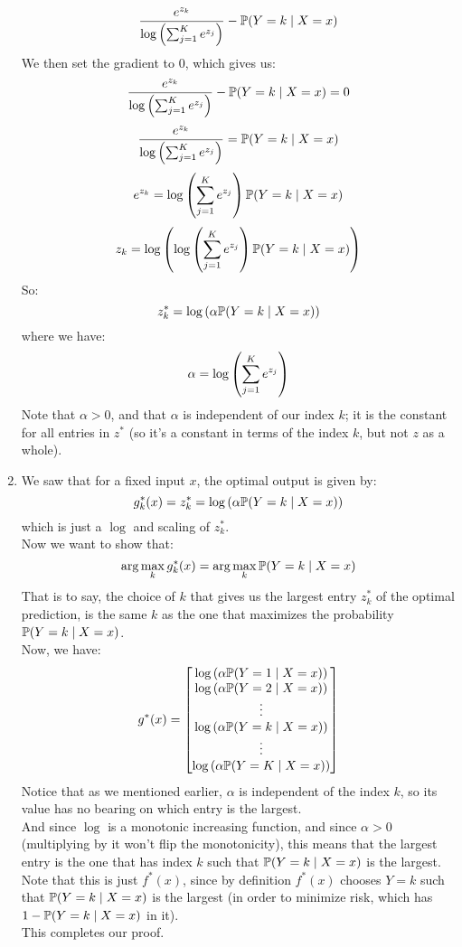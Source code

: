 \documentclass[12pt]{article}
\begin{document}
\begin{enumerate}[label=\alph*)]
    \[ \dfrac{e^{z_k}}
    {\log\left( \sum_{j=1}^K e^{z_j} \right)}
    - \mathbb{P}(Y = k \mid X = x) \]
    We then set the gradient to $0$,
    which gives us:
    \[ \dfrac{e^{z_k}}
    {\log\left( \sum_{j=1}^K e^{z_j} \right)}
    - \mathbb{P}(Y = k \mid X = x) = 0 \]
    \[ \dfrac{e^{z_k}}
    {\log\left( \sum_{j=1}^K e^{z_j} \right)}
    = \mathbb{P}(Y = k \mid X = x) \]
    \[ e^{z_k}
    = \log\left( \sum_{j=1}^K e^{z_j} \right)
    \mathbb{P}(Y = k \mid X = x) \]
    \[ z_k
    = \log\left( \log\left( \sum_{j=1}^K e^{z_j} \right)
    \mathbb{P}(Y = k \mid X = x) \right) \]
    So:
    \[ z^*_k = \log\left( 
    \alpha \mathbb{P}(Y = k \mid X = x) \right) \]
    where we have:
    \[ \alpha = \log\left( \sum_{j=1}^K e^{z_j} \right) \]
    Note that $\alpha > 0$,
    and that $\alpha$ is independent
    of our index $k$;
    it is the constant for all entries
    in $z^*$
    (so it's a constant in terms of the index $k$,
    but not $z$ as a whole). \\
    \item 
    We saw that for a fixed input $x$,
    the optimal output is given by:
    \[ g^*_k(x) = z^*_k = \log\left( 
    \alpha \mathbb{P}(Y = k \mid X = x) \right) \]
    which is just a $\log$
    and scaling of $z^*_k$. \\
    Now we want to show that:
    \[ \arg \max_k g^*_k(x)
    =  \arg \max_k \mathbb{P}(Y = k \mid X = x) \]
    That is to say,
    the choice of $k$
    that gives us the largest
    entry $z^*_k$ of the optimal prediction,
    is the same $k$ as the one that
    maximizes the probability
    $\mathbb{P}(Y = k \mid X = x)$. \\
    Now, we have:
    \[ g^*(x)
    = \begin{bmatrix}
        \log\left( \alpha
        \mathbb{P}(Y = 1 \mid X = x) \right) \\
        \log\left( \alpha
        \mathbb{P}(Y = 2 \mid X = x) \right) \\ 
        \vdots \\
        \log\left( \alpha
        \mathbb{P}(Y = k \mid X = x) \right) \\ 
        \vdots \\
        \log\left( \alpha
        \mathbb{P}(Y = K \mid X = x) \right) \\ 
    \end{bmatrix} \]
    Notice that as we mentioned earlier,
    $\alpha$ is independent of the index $k$,
    so its value has no bearing on
    which entry is the largest. \\
    And since $\log$ is a monotonic
    increasing function,
    and since $\alpha > 0$
    (multiplying by it won't 
    flip the monotonicity),
    this means that the largest entry
    is the one that has index $k$ such that
    $\mathbb{P}(Y = k \mid X = x)$
    is the largest. \\
    Note that this is just $f^*(x)$,
    since by definition $f^*(x)$
    chooses $Y = k$ such that $\mathbb{P}(Y = k \mid X = x)$
    is the largest (in order to minimize risk,
    which has $1 -  \mathbb{P}(Y = k \mid X = x)$
    in it). \\
    This completes our proof. \\
    

\end{enumerate}
\end{document}
